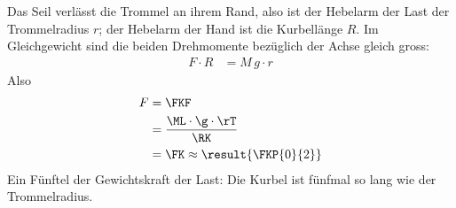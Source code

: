 Das Seil verlässt die Trommel an ihrem Rand, also ist der Hebelarm der Last der Trommelradius $r$; der Hebelarm der Hand ist die Kurbellänge $R$. Im Gleichgewicht sind die beiden Drehmomente bezüglich der Achse gleich gross:
\begin{align}
 F\cdot R &= M\,g\cdot r
\end{align}
Also
\begin{align}
 F &= \FKF \\
   &= \frac{\ML\cdot\g\cdot\rT}{\RK} \\
   &= \FK \approx \result{\FKP{0}{2}}
\end{align}
Ein Fünftel der Gewichtskraft der Last: Die Kurbel ist fünfmal so lang wie der Trommelradius.
